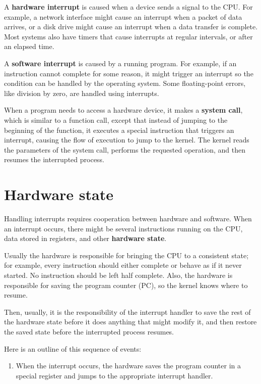 \documentclass[12pt]{book}
\begin{document}
{%

A {\bf hardware interrupt} is caused when a device sends a signal to the
CPU.  For example, a network interface might cause an interrupt when
a packet of data arrives, or a disk drive might cause an interrupt
when a data transfer is complete.  Most systems also have timers that
cause interrupts at regular intervals, or after an elapsed time.

A {\bf software interrupt} is caused by a running program.  For example, if
an instruction cannot complete for some reason, it might trigger an
interrupt so the condition can be handled by the operating system.
Some floating-point errors, like division by zero, are handled
using interrupts.

When a program needs to access a hardware device,
it makes a {\bf system call}, which is similar to a function call,
except that instead of jumping to the beginning of the function,
it executes a special instruction that triggers an interrupt, causing
the flow of execution to jump to the kernel.  The kernel reads the
parameters of the system call, performs the requested operation,
and then resumes the interrupted process.


\section{Hardware state}

Handling interrupts requires cooperation between hardware and
software.  When an interrupt occurs, there might be several
instructions running on the CPU, data stored in registers, and
other {\bf hardware state}.

Usually the hardware is responsible for bringing the CPU
to a consistent state; for example, every instruction should either
complete or behave as if it never started.  No instruction should
be left half complete.  Also, the hardware is responsible for
saving the program counter (PC), so the kernel knows where to
resume.

Then, usually, it is the responsibility of the interrupt handler
to save the rest of the hardware state before it does anything that
might modify it, and then restore the saved state before the interrupted
process resumes.

Here is an outline of this sequence of events:

\begin{enumerate}

\item When the interrupt occurs, the hardware saves the program
counter in a special register and jumps to the appropriate interrupt
handler.


\end{enumerate}}
\end{document}
